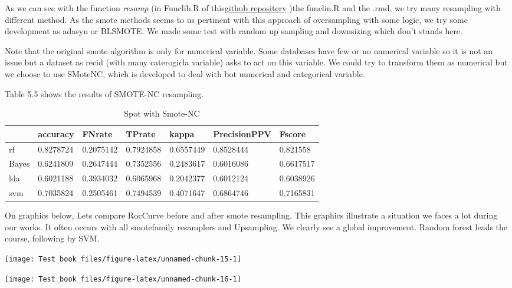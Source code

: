 \documentclass[
]{report}
\begin{document}
As we can see with the function \emph{resamp} (in Funclib.R of this\href{https://github.com/arkansoap/Memoire-M1}{github repositery} )the funclin.R and the .rmd, we try many resampling with different method. As the smote methods seems to us pertinent with this approach of oversampling with some logic, we try some development as adasyn or BLSMOTE. We made some test with random up sampling and downsizing which don't stands here.

Note that the original smote algorithm is only for numerical variable. Some databases have few or no numerical variable so it is not an issue but a dataset as recid (with many caterogicla variable) asks to act on this variable. We could try to transform them as numerical but we choose to use SMoteNC, which is developed to deal with bot numerical and categorical variable.

Table 5.5 shows the results of SMOTE-NC resampling.

\begin{table}

\caption{\label{tab:unnamed-chunk-14}Spot with Smote-NC}
\centering
\begin{tabular}[t]{l|l|l|l|l|l|l}
\hline
  & accuracy & FNrate & TPrate & kappa & PrecisionPPV & Fscore\\
\hline
rf & 0.8278724 & 0.2075142 & 0.7924858 & 0.6557449 & 0.8528444 & 0.821558\\
\hline
Bayes & 0.6241809 & 0.2647444 & 0.7352556 & 0.2483617 & 0.6016086 & 0.6617517\\
\hline
lda & 0.6021188 & 0.3934032 & 0.6065968 & 0.2042377 & 0.6012124 & 0.6038926\\
\hline
svm & 0.7035824 & 0.2505461 & 0.7494539 & 0.4071647 & 0.6864746 & 0.7165831\\
\hline
\end{tabular}
\end{table}

On graphics below, Lets compare RocCurve before and after smote resampling. This graphics illustrate a situation we faces a lot during our works. It often occurs with all smotefamily resamplers and Upsampling. We clearly see a global improvement. Random forest leads the course, following by SVM.

\begin{center}\texttt{[image: Test\_book\_files/figure-latex/unnamed-chunk-15-1]} \end{center}

\begin{center}\texttt{[image: Test\_book\_files/figure-latex/unnamed-chunk-16-1]} \end{center}
\end{document}
